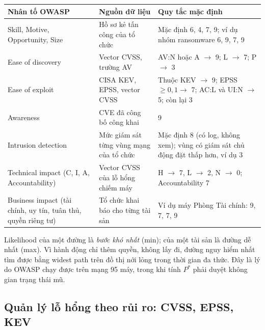 \documentclass[11pt,a4paper]{article}
\begin{document}
\begin{center}
\small
\begin{tabular}{@{}Y{3.6cm}Y{6.2cm}Y{6.2cm}@{}}
\toprule
\textbf{Nhân tố OWASP} & \textbf{Nguồn dữ liệu} & \textbf{Quy tắc mặc định} \\
\midrule
Skill, Motive, Opportunity, Size & Hồ sơ kẻ tấn công của tổ chức & Mặc định 6, 4, 7, 9; ví dụ nhóm ransomware 6, 9, 7, 9 \\
Ease of discovery & Vector CVSS, trường AV & AV:N hoặc A $\to$ 9; L $\to$ 7; P $\to$ 3 \\
Ease of exploit & CISA KEV, EPSS, vector CVSS & Thuộc KEV $\to$ 9; EPSS $\ge 0{,}1 \to$ 7; AC:L và UI:N $\to$ 5; còn lại 3 \\
Awareness & CVE đã công bố công khai & 9 \\
Intrusion detection & Mức giám sát từng vùng mạng của tổ chức & Mặc định 8 (có log, không xem); vùng có giám sát chủ động đặt thấp hơn, ví dụ 3 \\
\midrule
Technical impact (C, I, A, Accountability) & Vector CVSS của lỗ hổng chiếm máy & H $\to$ 7, L $\to$ 2, N $\to$ 0; Accountability 7 \\
Business impact (tài chính, uy tín, tuân thủ, quyền riêng tư) & Tổ chức khai báo cho từng tài sản & Ví dụ máy Phòng Tài chính: 9, 7, 7, 9 \\
\bottomrule
\end{tabular}
\end{center}

Likelihood của một đường là \emph{bước khó nhất} (min); của một tài sản là đường dễ nhất (max). Vì hành động chỉ thêm quyền, không lấy đi, đường nguy hiểm nhất tìm được bằng widest path trên đồ thị nới lỏng trong thời gian đa thức. Đây là lý do OWASP chạy được trên mạng 95 máy, trong khi tính $P^{*}$ phải duyệt không gian trạng thái mũ.

\subsection{Quản lý lỗ hổng theo rủi ro: CVSS, EPSS, KEV}
\end{document}
